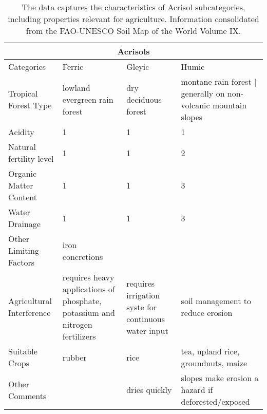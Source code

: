 \begin{table}
  \caption{The data captures the characteristics of Acrisol subcategories, including properties relevant for agriculture. Information consolidated from the FAO-UNESCO Soil Map of the World Volume IX.}
\begin{center}
  \begin{tabular}{ | p{5cm} | p{3cm} | p{3cm} | p{3cm} |}
    \hline
    \multicolumn{4}{|c|}{Acrisols} \\
    \hline
    Categories & Ferric & Gleyic & Humic \\ \hline
    Tropical Forest Type & lowland evergreen rain forest & dry deciduous forest & montane rain forest | generally on non-volcanic mountain slopes\\ \hline
    Acidity & 1 & 1 &  1 \\ \hline
    Natural fertility level & 1 & 1 & 2 \\ \hline
    Organic Matter Content & 1 & 1 & 3\\ \hline
    Water Drainage & 1 & 1 & 3 \\ \hline
    Other Limiting Factors & iron concretions & &\\ \hline
    Agricultural Interference & requires heavy applications of phosphate, potassium and nitrogen fertilizers & requires irrigation syste for continuous water input & soil management to reduce erosion\\ \hline
    Suitable Crops & rubber & rice & tea, upland rice, groundnuts, maize \\ \hline
    Other Comments & & dries quickly & slopes make erosion a hazard if deforested/exposed\\ 
    \hline
    \end{tabular}
		\end{center}
\end{table}
 
